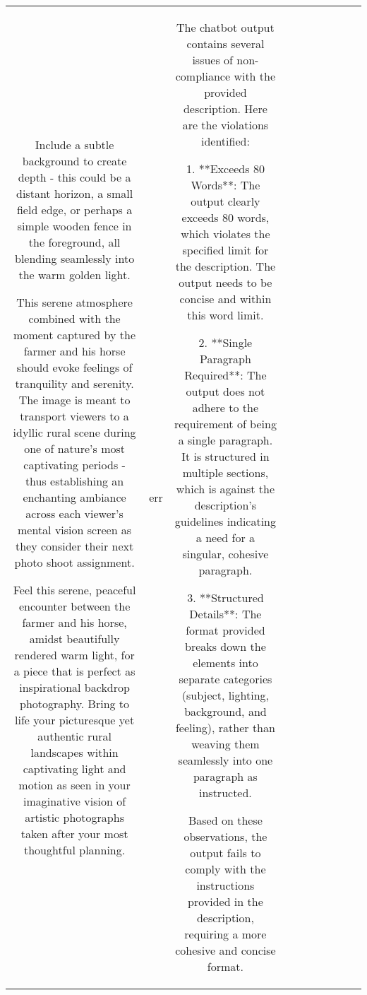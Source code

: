 \begin{table}[h!]
\begin{tabular}{|c|c|c|c|c|c|c|c|c|c|}
Include a subtle background to create depth - this could be a distant horizon, a small field edge, or perhaps a simple wooden fence in the foreground, all blending seamlessly into the warm golden light.

This serene atmosphere combined with the moment captured by the farmer and his horse should evoke feelings of tranquility and serenity. The image is meant to transport viewers to a idyllic rural scene during one of nature's most captivating periods - thus establishing an enchanting ambiance across each viewer's mental vision screen as they consider their next photo shoot assignment.

Feel this serene, peaceful encounter between the farmer and his horse, amidst beautifully rendered warm light, for a piece that is perfect as inspirational backdrop photography. Bring to life your picturesque yet authentic rural landscapes within captivating light and motion as seen in your imaginative vision of artistic photographs taken after your most thoughtful planning. & err & The chatbot output contains several issues of non-compliance with the provided description. Here are the violations identified:

1. **Exceeds 80 Words**: The output clearly exceeds 80 words, which violates the specified limit for the description. The output needs to be concise and within this word limit.

2. **Single Paragraph Required**: The output does not adhere to the requirement of being a single paragraph. It is structured in multiple sections, which is against the description's guidelines indicating a need for a singular, cohesive paragraph.

3. **Structured Details**: The format provided breaks down the elements into separate categories (subject, lighting, background, and feeling), rather than weaving them seamlessly into one paragraph as instructed.

Based on these observations, the output fails to comply with the instructions provided in the description, requiring a more cohesive and concise format.


\end{tabular}
\end{table}
